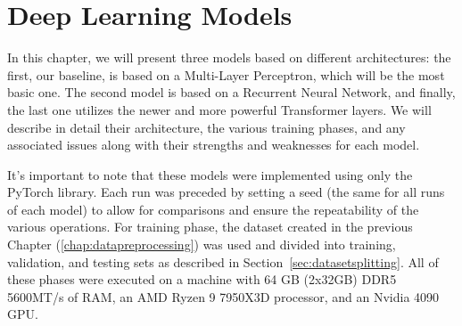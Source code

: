 \chapter{Deep Learning Models}
In this chapter, we will present three models based on
different architectures: the first, our baseline, is based on a
Multi-Layer Perceptron, which will be the most basic one.
The second model is based on a Recurrent Neural Network, and finally,
the last one utilizes the newer and more powerful Transformer layers.
We will describe in detail their architecture, the various training phases,
and any associated issues along with their strengths and weaknesses
for each model.

It's important to note that these models were implemented using only
the PyTorch\cite{pytorch} library.
Each run was preceded by setting a seed (the same for all runs of each model)
to allow for comparisons and ensure the repeatability of the
various operations. For training phase, the dataset created in the
previous Chapter (\ref{chap:datapreprocessing}) was used and divided
into training, validation, and testing sets as described in Section~\ref{sec:datasetsplitting}.
All of these phases were executed on a machine with 64 GB (2x32GB) DDR5 5600MT/s of RAM,
an AMD Ryzen 9 7950X3D processor, and an Nvidia 4090 GPU.
\newpage
%
%


%